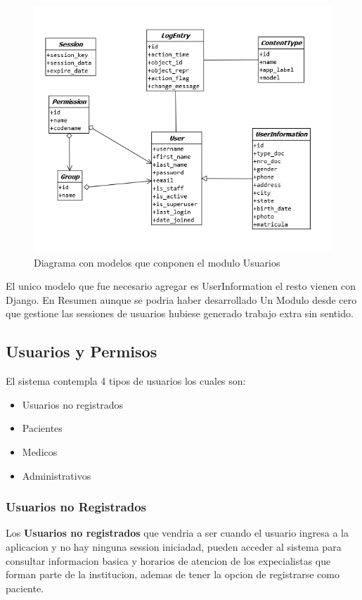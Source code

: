 \begin{figure}[H]
    \centering
    \includegraphics[scale=0.7]{resourse/uml-users.png}
    \caption{Diagrama con modelos que conponen el modulo Usuarios}
    \label{fig:07}
\end{figure}

El unico modelo que fue necesario agregar es UserInformation el resto vienen
con Django. En Resumen aunque se podria haber desarrollado Un Modulo desde
cero que gestione las sessiones de usuarios hubiese generado trabajo extra sin
sentido.

\subsection{Usuarios y Permisos}

El sistema contempla 4 tipos de usuarios los cuales son: 

\begin{itemize}
    \item Usuarios no registrados 
    \item Pacientes
    \item Medicos
    \item Administrativos
\end{itemize}

\subsubsection{Usuarios no Registrados}

Los \textbf{Usuarios no registrados} que vendria a ser cuando el usuario ingresa
a la aplicacion y no hay ninguna session iniciadad, pueden acceder al sistema para 
consultar informacion basica y horarios de atencion de los expecialistas que 
forman parte de la institucion, ademas de tener la opcion de registrarse 
como paciente.\\[0.1cm]    

